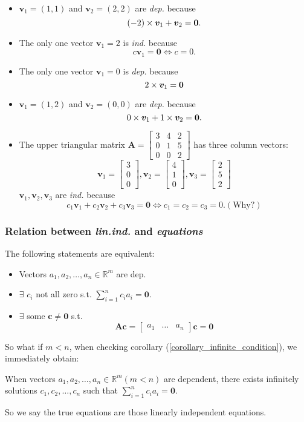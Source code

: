 \begin{example}\qquad\\
\begin{itemize}
\item
$\bm v_1=(1,1)$ and $\bm v_2 = (2,2)$ are \emph{dep.} because
\[
(-2)\times\bm v_1 + \bm v_2 = \bm 0.
\]
\item
The only one vector $\bm v_1=2$ is \emph{ind.} because 
\[
c\bm v_1 = \bm 0
\Longleftrightarrow
c=0.
\]
\item
The only one vector $\bm v_1=0$ is \emph{dep.} because
\[
2\times\bm v_1 = \bm 0
\]
\item
$\bm v_1 = (1,2)$ and $\bm v_2 = (0,0)$ are \emph{dep.} because
\[
0\times\bm v_1 + 1\times\bm v_2 = \bm 0.
\]
\item
The upper triangular matrix $\bm A = \begin{bmatrix}
3&4&2\\0&1&5\\0&0&2
\end{bmatrix}$ has three column vectors:
\[
\bm v_1 = \begin{bmatrix}
3\\0\\0
\end{bmatrix},\bm v_2 = \begin{bmatrix}
4\\1\\0
\end{bmatrix},\bm v_3 = \begin{bmatrix}
2\\5\\2
\end{bmatrix}
\]
$\bm v_1,\bm v_2,\bm v_3$ are \emph{ind.} because
\[
c_1\bm v_1 + c_2\bm v_2 + c_3\bm v_3 = \bm 0
\Longleftrightarrow
c_1=c_2=c_3=0. (\text{Why?})
\]
\end{itemize}
\end{example}
\subsubsection{Relation between \textit{lin.ind.} and \textit{equations}}
The following statements are equivalent:
\begin{itemize}
\item
Vectors $a_1,a_2,\dots,a_n\in\mathbb{R}^{m}$ are dep.
\item
$\exists$ $c_i$ not all zero s.t. $\sum_{i=1}^{n}c_ia_i = \bm 0$.
\item
$\exists$ some $\bm c\ne\bm 0$ s.t.
\[
\bm{Ac} = \left[\begin{array}{c|c|c}
a_1&\dots&a_n
\end{array}\right]\bm c = \bm 0
\]
\end{itemize}
So what if $m<n$, when checking corollary (\ref{corollary_infinite_condition}), we immediately obtain:
\begin{corollary}
When vectors $a_1,a_2,\dots,a_n\in\mathbb{R}^{m}(m<n)$ are dependent, there exists infinitely solutions $c_1,c_2,\dots,c_n$ such that $\sum_{i=1}^{n}c_ia_i = \bm 0$.
\end{corollary}
So we say the true equations are those linearly independent equations.
\newpage

